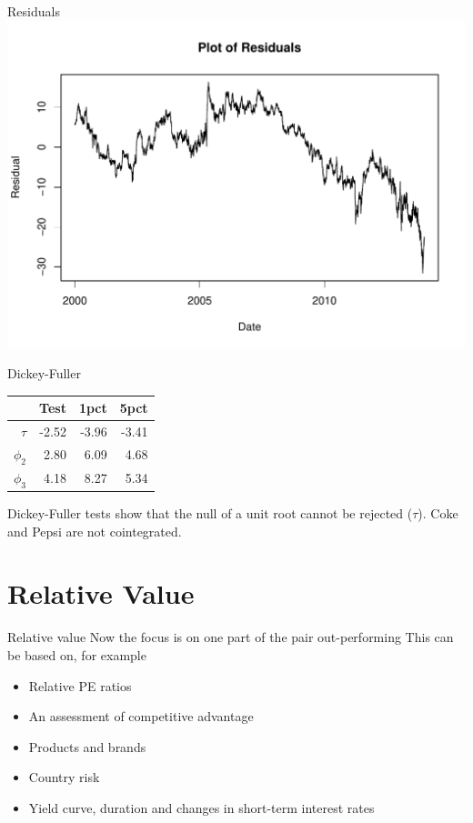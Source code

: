 \documentclass[14pt,xcolor=pdftex,dvipsnames,table]{beamer}\usepackage{graphicx, color}
\makeatletter
\def\maxwidth{ %
  \ifdim\Gin@nat@width>\linewidth
    \linewidth
  \else
    \Gin@nat@width
  \fi
}
\newenvironment{knitrout}{}{} %
\makeatother
\begin{document}
\begin{frame}{Residuals}
\begin{knitrout}
\color{fgcolor}
\includegraphics[width=\maxwidth]{figure/Resid} 

\end{knitrout}

\end{frame}

\begin{frame}{Dickey-Fuller}
\begin{table}[ht]
\centering
\begin{tabular}{rrrr}
  \hline
   & Test & 1pct& 5pct  \\ 
  \hline
$\tau$ & -2.52 & -3.96 & -3.41\\
 $\phi_2$ & 2.80 & 6.09 & 4.68\\ 
$\phi_3$ & 4.18 & 8.27 & 5.34\\ 
   \hline
\end{tabular}
\end{table}
Dickey-Fuller tests  show that the null of a unit root cannot be rejected ($\tau$).  Coke and Pepsi are not cointegrated. 
\end{frame}

\section{Relative Value}
\begin{frame}{Relative value}
Now the focus is on one part of the pair out-performing
This can be based on, for example
\begin{itemize}[<+-| alert@+>]
\item Relative PE ratios
\item An assessment of competitive advantage
\item Products and brands
\item Country risk
\item Yield curve, duration and changes in short-term interest rates
\end{itemize}

\end{frame}
\end{document}
